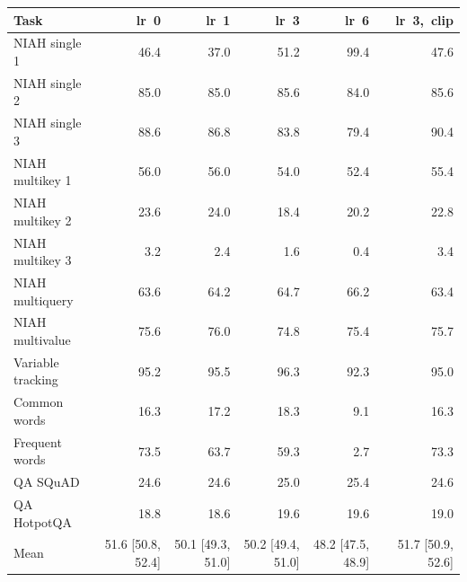 \begin{tabular}{lrrrrr}
\toprule
Task & lr~0 & lr~1 & lr~3 & lr~6 & lr~3,~clip \\
\midrule
NIAH single 1 & 46.4 & 37.0 & 51.2 & 99.4 & 47.6 \\
NIAH single 2 & 85.0 & 85.0 & 85.6 & 84.0 & 85.6 \\
NIAH single 3 & 88.6 & 86.8 & 83.8 & 79.4 & 90.4 \\
NIAH multikey 1 & 56.0 & 56.0 & 54.0 & 52.4 & 55.4 \\
NIAH multikey 2 & 23.6 & 24.0 & 18.4 & 20.2 & 22.8 \\
NIAH multikey 3 & 3.2 & 2.4 & 1.6 & 0.4 & 3.4 \\
NIAH multiquery & 63.6 & 64.2 & 64.7 & 66.2 & 63.4 \\
NIAH multivalue & 75.6 & 76.0 & 74.8 & 75.4 & 75.7 \\
Variable tracking & 95.2 & 95.5 & 96.3 & 92.3 & 95.0 \\
Common words & 16.3 & 17.2 & 18.3 & 9.1 & 16.3 \\
Frequent words & 73.5 & 63.7 & 59.3 & 2.7 & 73.3 \\
QA SQuAD & 24.6 & 24.6 & 25.0 & 25.4 & 24.6 \\
QA HotpotQA & 18.8 & 18.6 & 19.6 & 19.6 & 19.0 \\
\midrule
Mean & 51.6 [50.8, 52.4] & 50.1 [49.3, 51.0] & 50.2 [49.4, 51.0] & 48.2 [47.5, 48.9] & 51.7 [50.9, 52.6] \\
\bottomrule
\end{tabular}
